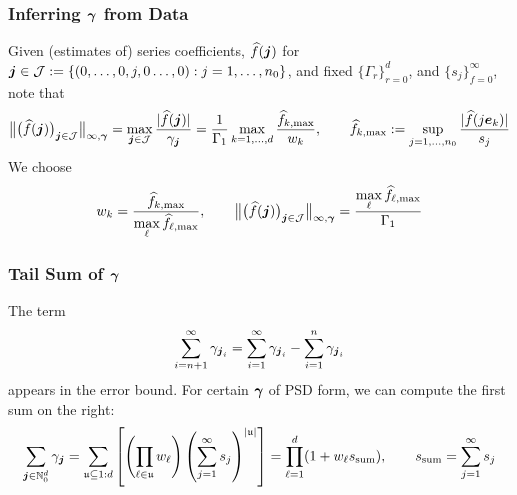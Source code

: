 \documentclass[11pt,compress,xcolor={usenames,dvipsnames},aspectratio=169]{beamer}
\begin{document}
\begin{frame}
\frametitle{Inferring $\vgamma$ from Data}
Given (estimates of) series coefficients, $\hf(\vj)$ for $\vj \in \cj := \{(0, \ldots, 0,j ,0 \ldots, 0) : j = 1, \ldots, n_0\}$, and fixed $\{\Gamma_r\}_{r=0}^d$, and $\{s_j\}_{f=0}^{\infty}$, note that
\begin{equation*}
\bignorm[\infty,\vgamma]{\bigl(\hf(\vj)\bigr)_{\vj \in \cj} } =  \max_{\vj \in \cj} \frac{\normabs{\hf(\vj)}}{\gamma_{\vj}} =  \frac{1}{\Gamma_1 } \max_{k = 1, \ldots, d}   \frac{\hf_{k,\max}}{w_k}, \qquad  \hf_{k,\max} : = \sup_{j = 1, \ldots, n_0} \frac{\normabs{\hf(j\ve_k)}}{s_j}
\end{equation*}
We choose
\begin{equation*}
w_k =    \frac{\hf_{k,\max}}{\displaystyle \max_\ell \hf_{\ell,\max}}, \qquad \bignorm[\infty,\vgamma]{\bigl(\hf(\vj)\bigr)_{\vj \in \cj} } = \frac{\displaystyle \max_\ell \hf_{\ell,\max}}{\Gamma_1}
\end{equation*}

\end{frame}

\begin{frame}
\frametitle{Tail Sum of $\vgamma$}
\vspace{0ex}
The term 
\begin{equation*}
\sum_{i = n+1}^{\infty}  \gamma_{\vj_{i}} = \sum_{i = 1}^{\infty}  \gamma_{\vj_{i}} - \sum_{i =1}^{n}  \gamma_{\vj_{i}}
\end{equation*}
appears in the error bound.  For certain $\vgamma$ of PSD form, we can compute the first sum on the right:
\begin{equation*}
\sum_{\vj \in \natzero^d} \gamma_{\vj} = \sum_{\fu \subseteq 1:d} \left[ \left(\prod_{\ell \in \fu} w_{\ell} \right) \left(\sum_{j=1}^{\infty} s_{j} \right)^{\abs{\fu}} \right]  = \prod_{\ell = 1}^d ( 1 + w_{\ell}  s_{\text{sum}} ), \qquad s_{\text{sum}} = \sum_{j=1}^{\infty} s_{j}
\end{equation*}


\end{frame}
\end{document}
